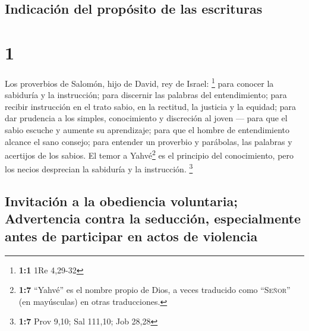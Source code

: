 \hypertarget{indicaciuxf3n-del-propuxf3sito-de-las-escrituras}{%
\subsection{Indicación del propósito de las
escrituras}\label{indicaciuxf3n-del-propuxf3sito-de-las-escrituras}}

\hypertarget{section}{%
\section{1}\label{section}}

 Los proverbios de Salomón, hijo de David, rey de Israel:
\footnote{\textbf{1:1} 1Re 4,29-32}  para conocer la
sabiduría y la instrucción; para discernir las palabras del
entendimiento;  para recibir instrucción en el trato
sabio, en la rectitud, la justicia y la equidad;  para dar
prudencia a los simples, conocimiento y discreción al joven ---
 para que el sabio escuche y aumente su aprendizaje; para
que el hombre de entendimiento alcance el sano consejo; 
para entender un proverbio y parábolas, las palabras y acertijos de los
sabios.  El temor a Yahvé\footnote{\textbf{1:7} ``Yahvé''
  es el nombre propio de Dios, a veces traducido como ``\textsc{Señor}''
  (en mayúsculas) en otras traducciones.} es el principio del
conocimiento, pero los necios desprecian la sabiduría y la instrucción.
\footnote{\textbf{1:7} Prov 9,10; Sal 111,10; Job 28,28}

\hypertarget{invitaciuxf3n-a-la-obediencia-voluntaria-advertencia-contra-la-seducciuxf3n-especialmente-antes-de-participar-en-actos-de-violencia}{%
\subsection{Invitación a la obediencia voluntaria; Advertencia contra la
seducción, especialmente antes de participar en actos de
violencia}\label{invitaciuxf3n-a-la-obediencia-voluntaria-advertencia-contra-la-seducciuxf3n-especialmente-antes-de-participar-en-actos-de-violencia}}

